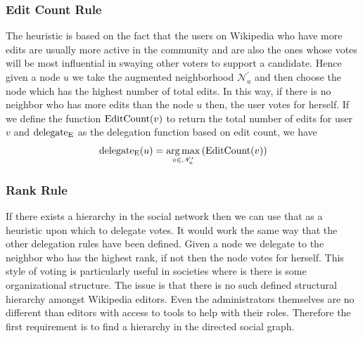 \subsubsection{Edit Count Rule}
The heuristic is based on the fact that the users on Wikipedia who have more edits are usually more active in the community and are also the ones whose votes will be most influential in swaying other voters to support a candidate. Hence given a node $u$ we take the augmented neighborhood $\mathcal{N}_u^{\prime}$ and then choose the node which has the highest number of total edits. In this way, if there is no neighbor who has more edits than the node $u$ then, the user votes for herself. If we define the function $\operatorname*{EditCount}(v)$ to return the total number of edits for user $v$ and $\operatorname*{delegate_E}$ as the delegation function based on edit count, we have 
\[\operatorname*{delegate_E}(u)  = \operatorname*{arg\,max}_{v \in \mathcal{N}_u^\prime} \left(\operatorname*{EditCount}(v) \right)\]

\subsubsection{Rank Rule}
If there exists a hierarchy in the social network then we can use that as a heuristic upon which to delegate votes. It would work the same way that the other delegation rules have been defined. Given a node we delegate to the neighbor who has the highest rank, if not then the node votes for herself. This style of voting is particularly useful in societies where is there is some organizational structure. The issue is that there is no such defined structural hierarchy amongst Wikipedia editors. Even the administrators themselves are no different than editors with access to tools to help with their roles. Therefore the first requirement is to find a hierarchy in the directed social graph.

